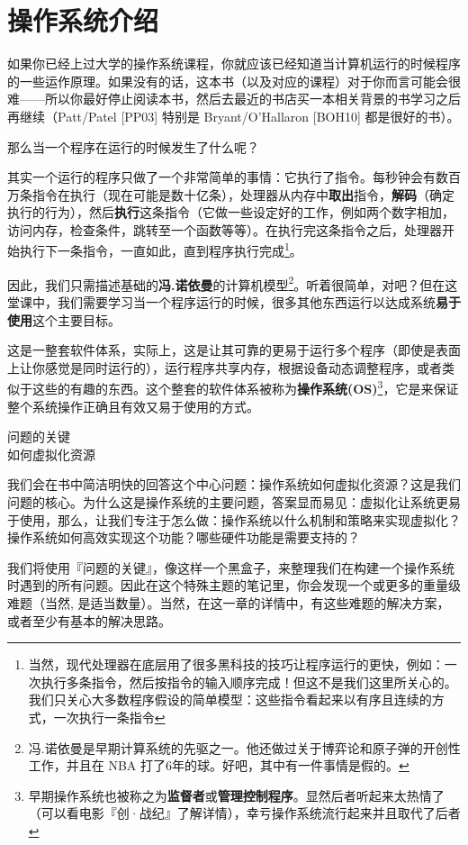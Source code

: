 \chapter{操作系统介绍}
\thispagestyle{empty}

如果你已经上过大学的操作系统课程，你就应该已经知道当计算机运行的时候程序的一些运作原理。如果没有的话，这本书（以及对应的课程）对于你而言可能会很难——所以你最好停止阅读本书，然后去最近的书店买一本相关背景的书学习之后再继续（Patt/Patel [PP03] 特别是 Bryant/O’Hallaron [BOH10] 都是很好的书）。

那么当一个程序在运行的时候发生了什么呢？

其实一个运行的程序只做了一个非常简单的事情：它执行了指令。每秒钟会有数百万条指令在执行（现在可能是数十亿条），处理器从内存中\textbf{取出}指令，\textbf{解码}（确定执行的行为），然后\textbf{执行}这条指令（它做一些设定好的工作，例如两个数字相加，访问内存，检查条件，跳转至一个函数等等）。在执行完这条指令之后，处理器开始执行下一条指令，一直如此，直到程序执行完成\footnote{当然，现代处理器在底层用了很多黑科技的技巧让程序运行的更快，例如：一次执行多条指令，然后按指令的输入顺序完成！但这不是我们这里所关心的。我们只关心大多数程序假设的简单模型：这些指令看起来以有序且连续的方式，一次执行一条指令}。

因此，我们只需描述基础的\textbf{冯.诺依曼}的计算机模型\footnote{冯.诺依曼是早期计算系统的先驱之一。他还做过关于博弈论和原子弹的开创性工作，并且在 NBA 打了6年的球。好吧，其中有一件事情是假的。}。听着很简单，对吧？但在这堂课中，我们需要学习当一个程序运行的时候，很多其他东西运行以达成系统\textbf{易于使用}这个主要目标。

这是一整套软件体系，实际上，这是让其可靠的更易于运行多个程序（即使是表面上让你感觉是同时运行的），运行程序共享内存，根据设备动态调整程序，或者类似于这些的有趣的东西。这个整套的软件体系被称为\textbf{操作系统(OS)}\footnote{早期操作系统也被称之为\textbf{监督者}或\textbf{管理控制程序}。显然后者听起来太热情了（可以看电影『创·战纪』了解详情），幸亏操作系统流行起来并且取代了后者}，它是来保证整个系统操作正确且有效又易于使用的方式。

\begin{tcolorbox}[colframe=grey,colback= grey,arc=0pt,left=6pt,right=6pt,top=6pt,bottom=6pt,boxsep=0pt]
\begin{center}
  问题的关键\\
  如何虚拟化资源
\end{center}
我们会在书中简洁明快的回答这个中心问题：操作系统如何虚拟化资源？这是我们问题的核心。为什么这是操作系统的主要问题，答案显而易见：虚拟化让系统更易于使用，那么，让我们专注于怎么做：操作系统以什么机制和策略来实现虚拟化？操作系统如何高效实现这个功能？哪些硬件功能是需要支持的？

我们将使用『问题的关键』，像这样一个黑盒子，来整理我们在构建一个操作系统时遇到的所有问题。因此在这个特殊主题的笔记里，你会发现一个或更多的重量级难题（当然, 是适当数量）。当然，在这一章的详情中，有这些难题的解决方案，或者至少有基本的解决思路。
\end{tcolorbox}

